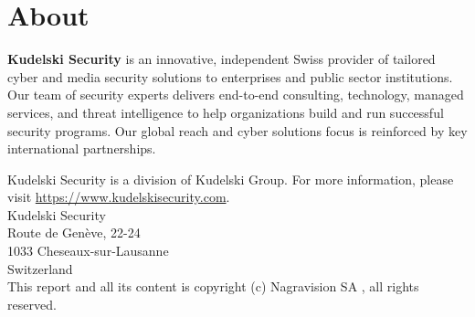 \chapter{About}

\textbf{Kudelski Security} is an innovative, independent Swiss provider of tailored
cyber and media security solutions to enterprises and public sector
institutions. Our team of security experts delivers end-to-end consulting,
technology, managed services, and threat intelligence to help organizations
build and run successful security programs. Our global reach and cyber
solutions focus is reinforced by key international partnerships.

Kudelski Security is a division of Kudelski Group. 
For more information, please visit \url{https://www.kudelskisecurity.com}.
~\\

\noindent
Kudelski Security\\
Route de Genève, 22-24\\
1033 Cheseaux-sur-Lausanne\\
Switzerland \\

This report and all its content is copyright (c) Nagravision SA \the\year, all rights reserved.

